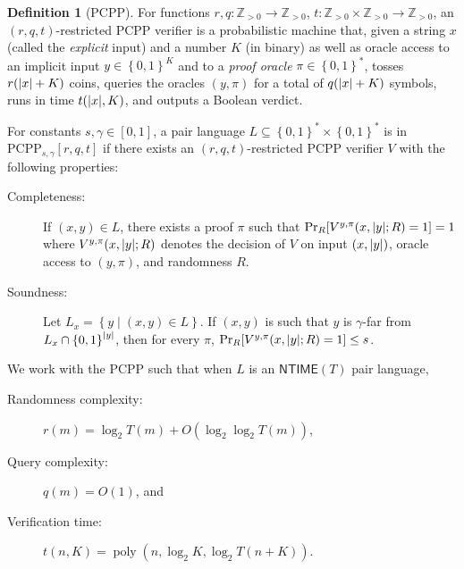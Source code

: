 \documentclass[11pt]{article}
\theoremstyle{plain}
\theoremstyle{definition}
\newtheorem{definition}[theorem]{Definition}
\newcommand {\set} [1] {\ensuremath{ \left\lbrace #1 \right\rbrace }}
\DeclarePairedDelimiter{\abs}{\lvert}{\rvert}
\newcommand{\poly} {\ensuremath{\operatorname{poly}}}
\newcommand{\1}{\mathbb{1}} %
\newcommand{\bZ}{\mathbb{Z}}
\newcommand{\PCPP}{\mathrm{PCPP}}
\begin{document}
\begin{definition}[PCPP]
    \label{def:pcpp}
    For functions $r, q: \bZ_{>0} \to \bZ_{>0}$, $t: \bZ_{>0} \times \bZ_{>0} \to \bZ_{>0}$,
    an $(r,q,t)$-restricted $\PCPP$ verifier is a probabilistic machine that, given a string $x$
    (called the \emph{explicit} input) and a number $K$ (in binary) as well as oracle access to an implicit input $y \in \set{0,1}^K$ and to a \emph{proof oracle} $\pi \in \set{0,1}^*$,
    tosses $r(\abs{x}+K)$ coins, queries the oracles $(y,\pi)$ for a total of $q(\abs{x}+K)$ symbols,
    runs in time $t(\abs{x}, K)$, and outputs a Boolean verdict.
    
    For constants $s,\gamma \in [0,1]$, a pair language $L \subseteq \set{0,1}^\ast \times \set{0,1}^\ast$ is in $\PCPP_{s,\gamma}[r,q,t]$  if there exists an $(r,q,t)$-restricted $\PCPP$
    verifier $V$ with the following properties:
    \begin{description}
        \item[Completeness:] If $(x,y) \in L$, there exists a proof $\pi$ such that 
        $\Pr_R[V^{y,\pi}(x, \abs{y};R) = 1] = 1$ where $V^{y,\pi}(x, \abs{y};R)$ denotes the decision of $V$
        on input $(x, \abs{y})$, oracle access to $(y, \pi)$, and randomness $R$.
        \item[Soundness:] Let $L_x = \set{y \mid (x,y) \in L}$. If $(x,y)$ is such that $y$ is $\gamma$-far from $L_x \cap \set{0,1}^{\abs{y}}$, then for every $\pi$, $\Pr_R[V^{y,\pi}(x, \abs{y};R) = 1] \leq s$.
    \end{description}
\end{definition}
We work with the $\PCPP$ such that when $L$ is an $\mathsf{NTIME}(T)$ pair language,
\begin{description}
    \item[Randomness complexity:] $r(m) = \log_2T(m) + O(\log_2\log_2 T(m))$,
    \item[Query complexity:] $q(m) = O(1)$, and 
    \item[Verification time:] $t(n, K) = \poly(n , \log_2 K, \log_2 T(n+K))$.
\end{description}
\end{document}
